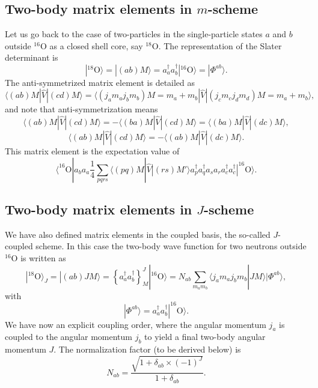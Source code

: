 \documentclass[%
twoside,                 %
final,                   %
10pt]{article}
\begin{document}
\subsection{Two-body matrix elements in $m$-scheme}
\begin{block}{}
Let us go back to the case of two-particles in the single-particle states $a$ and $b$ outside ${}^{16}\mbox{O}$ as a closed shell core, say ${}^{18}\mbox{O}$.
The representation of the Slater determinant is 
\[
|^{18}\mathrm{O}\rangle =|(ab)M\rangle  = a^{\dagger}_aa^{\dagger}_b|^{16}\mathrm{O}\rangle=|\Phi^{ab}\rangle.
\]
The anti-symmetrized matrix element is detailed as 
\[
\langle (ab) M | \hat{V} | (cd) M \rangle = \langle (j_am_aj_bm_b)M=m_a+m_b |  \hat{V} | (j_cm_cj_dm_d)M=m_a+m_b \rangle,
\]
and note that anti-symmetrization means 
\[
\langle (ab) M | \hat{V} | (cd) M \rangle =-\langle (ba) M | \hat{V} | (cd) M \rangle =\langle (ba) M | \hat{V} | (dc) M \rangle,
\]
\[
\langle (ab) M | \hat{V} | (cd) M \rangle =-\langle (ab) M | \hat{V} | (dc) M \rangle. 
\]
This matrix element is the expectation value of 
\[
\langle ^{16}\mathrm{O}|a_ba_a\frac{1}{4}\sum_{pqrs}\langle (pq) M | \hat{V} | (rs) M' \rangle a^{\dagger}_pa^{\dagger}_qa_sa_r a^{\dagger}_ca^{\dagger}_c|^{16}\mathrm{O}\rangle.
\]
\end{block}


\subsection{Two-body matrix elements in $J$-scheme}
\begin{block}{}
We have also defined matrix elements in the coupled basis, the so-called $J$-coupled scheme.
In this case the two-body wave function for two neutrons outside ${}^{16}\mbox{O}$ is written as 
\[
|^{18}\mathrm{O}\rangle_J =|(ab)JM\rangle  = \left\{a^{\dagger}_aa^{\dagger}_b\right\}^J_M|^{16}\mathrm{O}\rangle=N_{ab}\sum_{m_am_b}\langle j_am_aj_bm_b|JM\rangle|\Phi^{ab}\rangle, 
\]
with
\[
|\Phi^{ab}\rangle=a^{\dagger}_aa^{\dagger}_b|^{16}\mathrm{O}\rangle.
\]
We have now an explicit coupling order, where the angular momentum $j_a$ is coupled to the angular momentum $j_b$ to yield a final two-body angular momentum $J$. 
The normalization factor (to be derived below) is
\[
N_{ab}=\frac{\sqrt{1+\delta_{ab}\times (-1)^J}}{1+\delta_{ab}}.
\]
\end{block}

\end{document}
